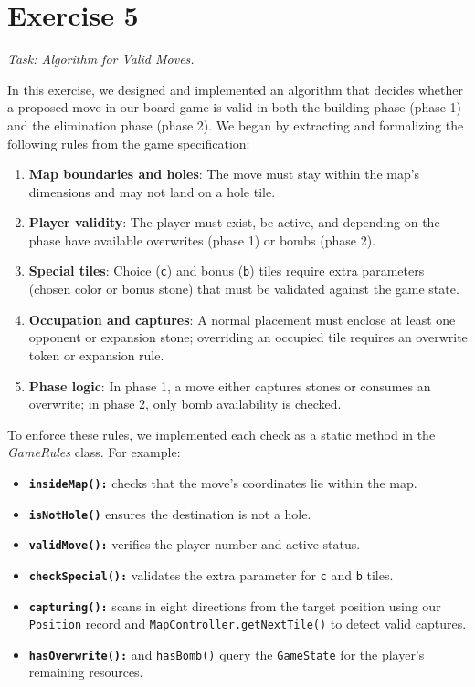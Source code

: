 \section{Exercise 5}
\textit{Task: Algorithm for Valid Moves.}\newline


\noindent In this exercise, we designed and implemented an algorithm that decides whether a proposed move in our board game is valid in both the building phase (phase 1) and the elimination phase (phase 2). We began by extracting and formalizing the following rules from the game specification:

\begin{enumerate}
    \item \textbf{Map boundaries and holes}: The move must stay within the map’s dimensions and may not land on a hole tile.
    \item \textbf{Player validity}: The player must exist, be active, and depending on the phase have available overwrites (phase 1) or bombs (phase 2).
    \item \textbf{Special tiles}: Choice (\texttt{c}) and bonus (\texttt{b}) tiles require extra parameters (chosen color or bonus stone) that must be validated against the game state.
    \item \textbf{Occupation and captures}: A normal placement must enclose at least one opponent or expansion stone; overriding an occupied tile requires an overwrite token or expansion rule.
    \item \textbf{Phase logic}: In phase 1, a move either captures stones or consumes an overwrite; in phase 2, only bomb availability is checked.
\end{enumerate}

\noindent To enforce these rules, we implemented each check as a static method in the \textit{GameRules} class. For example:
\begin{itemize}
  \item \textbf{\texttt{insideMap():}} checks that the move’s coordinates lie within the map.
  \item \textbf{\texttt{isNotHole()}} ensures the destination is not a hole.
  \item \textbf{\texttt{validMove():}} verifies the player number and active status.
  \item \textbf{\texttt{checkSpecial():}} validates the extra parameter for \texttt{c} and \texttt{b} tiles.
  \item \textbf{\texttt{capturing():}} scans in eight directions from the target position using our \texttt{Position} record and \texttt{MapController.getNextTile()} to detect valid captures.
  \item \textbf{\texttt{hasOverwrite():}} and \texttt{hasBomb()} query the \texttt{GameState} for the player’s remaining resources.
\end{itemize}

